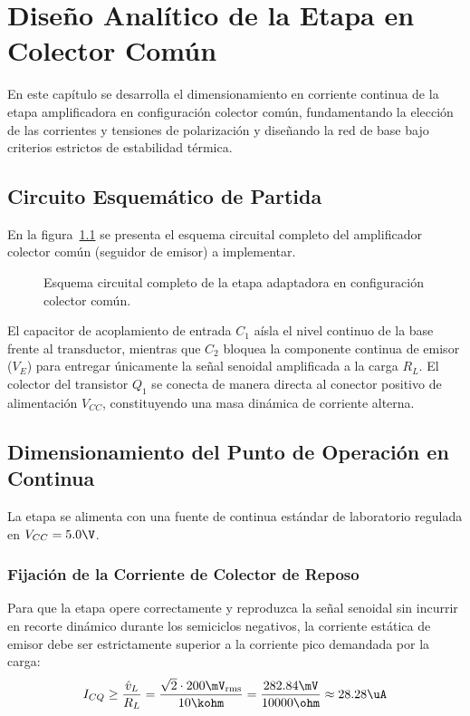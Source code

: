 \chapter{Diseño Analítico de la Etapa en Colector Común}
\label{chap:diseno_teorico}

En este capítulo se desarrolla el dimensionamiento en corriente continua de la etapa amplificadora en configuración
colector común, fundamentando la elección de las corrientes y tensiones de polarización y diseñando la red de base
bajo criterios estrictos de estabilidad térmica.

\section{Circuito Esquemático de Partida}

En la figura~\ref{crkt:colector_comun} se presenta el esquema circuital completo del amplificador colector común
(seguidor de emisor) a implementar.

\begin{figure}[!ht]
  \centering
  
  \caption{Esquema circuital completo de la etapa adaptadora en configuración colector común.}
  \label{crkt:colector_comun}
\end{figure}

El capacitor de acoplamiento de entrada $C_1$ aísla el nivel continuo de la base frente al transductor, mientras que $C_2$
bloquea la componente continua de emisor ($V_E$) para entregar únicamente la señal senoidal amplificada a la carga $R_L$.
El colector del transistor $Q_1$ se conecta de manera directa al conector positivo de alimentación $V_{CC}$, constituyendo
una masa dinámica de corriente alterna.

\section{Dimensionamiento del Punto de Operación en Continua}

La etapa se alimenta con una fuente de continua estándar de laboratorio regulada en $V_{CC} = 5.0\V$.

\subsection{Fijación de la Corriente de Colector de Reposo}
Para que la etapa opere correctamente y reproduzca la señal senoidal sin incurrir en recorte dinámico durante los semiciclos
negativos, la corriente estática de emisor debe ser estrictamente superior a la corriente pico demandada por la carga:
\begin{equation}
  I_{CQ} \ge \frac{\hat{v}_L}{R_L} = \frac{\sqrt{2} \cdot 200\mV_{\mathrm{rms}}}{10\kohm} = \frac{282.84\mV}{10000\ohm} \approx 28.28\uA
  \label{eq:Icq_min}
\end{equation}

